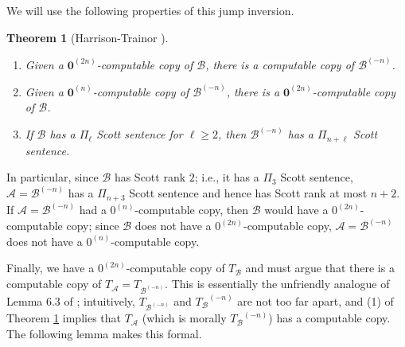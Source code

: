 \documentclass[10pt,a4paper]{article}
\newcommand{\Inv}[2]{{#2}^{(-#1)}}
\newtheorem{thm}{Theorem}[section]
\theoremstyle{definition}
\begin{document}
	We will use the following properties of this jump inversion.
	
	\begin{thm}[Harrison-Trainor \cite{unfriendly}]\label{thm:unfriendly}{\ }
		\begin{enumerate}
			\item Given a $\mathbf{0}^{(2n)}$-computable copy of $\mathcal{B}$, there is a computable copy of $\Inv{n}{\mathcal{B}}$.
			\item Given a $\mathbf{0}^{(n)}$-computable copy of $\Inv{n}{\mathcal{B}}$, there is a $\mathbf{0}^{(2n)}$-computable copy of $\mathcal{B}$.
			\item If $\mathcal{B}$ has a $\Pi_\ell$ Scott sentence for $\ell \geq 2$, then $\Inv{n}{\mathcal{B}}$ has a $\Pi_{n+\ell}$ Scott sentence.
		\end{enumerate}
	\end{thm}
	
	In particular, since $\mathcal{B}$ has Scott rank $2$; i.e., it has a $\Pi_3$ Scott sentence, $\mathcal{A} = \Inv{n}{\mathcal{B}}$ has a $\Pi_{n+3}$ Scott sentence and hence has Scott rank at most $n+2$.
	If $\mathcal{A} = \Inv{n}{\mathcal{B}}$ had a $0^{(n)}$-computable copy, then $\mathcal{B}$ would have a $0^{(2n)}$-computable copy; since $\mathcal{B}$ does not have a $0^{(2n)}$-computable copy, $\mathcal{A} =\Inv{n}{\mathcal{B}}$ does not have a $0^{(n)}$-computable copy.
	
	Finally, we have a $0^{(2n)}$-computable copy of $T_{\mathcal{B}}$ and must argue that there is a computable copy of $T_{\mathcal{A}} = T_{\Inv{n}{\mathcal{B}}}$. This is essentially the unfriendly analogue of Lemma 6.3 of \cite{HTMontalban}; intuitively, $T_{\Inv{n}{\mathcal{B}}}$ and $\Inv{n}{T_{\mathcal{B}}}$ are not too far apart, and (1) of Theorem \ref{thm:unfriendly} implies that $T_{\mathcal{A}}$ (which is morally $\Inv{n}{T_{\mathcal{B}}}$) has a computable copy. The following lemma makes this formal.
	
\end{document}
